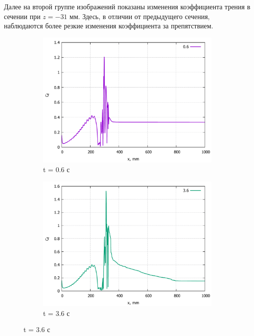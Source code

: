 	Далее на второй группе изображений показаны изменения коэффициента трения в сечении при $z = -31$ мм. Здесь, в отличии от предыдущего сечения, наблюдаются более резкие изменения коэффициента за препятствием.
	\begin{figure}[H]
		\begin{subfigure}{.5\textwidth}
			\centering
			\includegraphics[width=1\linewidth]{../Assets/Cf-T06-31m}
			\caption{t = 0.6 с}
			\label{fig:Cf-T06-31m}
		\end{subfigure}%
		\begin{subfigure}{.5\textwidth}
			\centering
			\includegraphics[width=1\linewidth]{../Assets/Cf-T360-31m}
			\caption{t = 3.6 с}
			\label{fig:Cf-T360-31m}
		\end{subfigure}

\end{figure}
